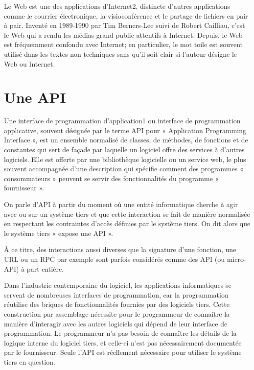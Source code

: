 Le Web est une des applications d’Internet2, distincte d’autres applications comme le courrier
électronique, la visioconférence et le partage de fichiers en pair à pair. Inventé en 1989-1990 par
Tim Berners-Lee suivi de Robert Cailliau, c'est le Web qui a rendu les médias grand public attentifs
à Internet. Depuis, le Web est fréquemment confondu avec Internet; en particulier, le mot toile est
souvent utilisé dans les textes non techniques sans qu'il soit clair si l'auteur désigne le Web ou
Internet.

\section{Une API}\label{subsec:api}
Une interface de programmation d’application1 ou interface de programmation applicative,
souvent désignée par le terme API pour « Application Programming Interface », est un ensemble
normalisé de classes, de méthodes, de fonctions et de constantes qui sert de façade par laquelle un
logiciel offre des services à d'autres logiciels. Elle est offerte par une bibliothèque logicielle ou
un service web, le plus souvent accompagnée d'une description qui spécifie comment des programmes
« consommateurs » peuvent se servir des fonctionnalités du programme « fournisseur ».

On parle d'API à partir du moment où une entité informatique cherche à agir
avec ou sur un système tiers et que cette interaction se fait de manière normalisée en
respectant les contraintes d'accès définies par le système tiers. On dit alors que le système
tiers « expose une API ».

À ce titre, des interactions aussi diverses que la signature d'une fonction, une URL ou un RPC
par exemple sont parfois considérés comme des API (ou micro-API) à part entière.

Dans l'industrie contemporaine du logiciel, les applications informatiques se servent de
nombreuses interfaces de programmation, car la programmation réutilise des briques de
fonctionnalités fournies par des logiciels tiers. Cette construction par assemblage nécessite
pour le programmeur de connaître la manière d’interagir avec les autres logiciels qui dépend
de leur interface de programmation. Le programmeur n'a pas besoin de connaître les détails de
la logique interne du logiciel tiers, et celle-ci n'est pas nécessairement documentée par le
fournisseur. Seule l'API est réellement nécessaire pour utiliser le système tiers en question.

